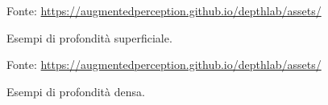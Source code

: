\documentclass[crop=false, class=book]{standalone}
\begin{document}
		\begin{figure}
				\centering
				{Fonte: \url{https://augmentedperception.github.io/depthlab/assets/}}
				\caption{Esempi di profondità superficiale.}
				\label{fig: surfaces-depth}
		\end{figure}
		
		\begin{figure}
				\centering
				{Fonte: \url{https://augmentedperception.github.io/depthlab/assets/}}
				\caption{Esempi di profondità densa.}
				\label{fig: dense-depth}
		\end{figure}
\end{document}
